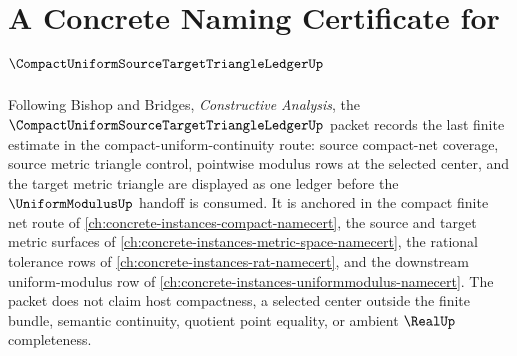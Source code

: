 \chapter{A Concrete Naming Certificate for $\CompactUniformSourceTargetTriangleLedgerUp$}
\label{ch:concrete-instances-compact-uniform-source-target-triangle-ledger-namecert}

Following Bishop and Bridges, \emph{Constructive Analysis}, the
$\CompactUniformSourceTargetTriangleLedgerUp$ packet records the last finite
estimate in the compact-uniform-continuity route: source compact-net coverage,
source metric triangle control, pointwise modulus rows at the selected center,
and the target metric triangle are displayed as one ledger before the
$\UniformModulusUp$ handoff is consumed. It is anchored in the compact finite
net route of \autoref{ch:concrete-instances-compact-namecert}, the source and
target metric surfaces of \autoref{ch:concrete-instances-metric-space-namecert},
the rational tolerance rows of \autoref{ch:concrete-instances-rat-namecert},
and the downstream uniform-modulus row of
\autoref{ch:concrete-instances-uniformmodulus-namecert}. The packet does not
claim host compactness, a selected center outside the finite bundle, semantic
continuity, quotient point equality, or ambient $\RealUp$ completeness.

